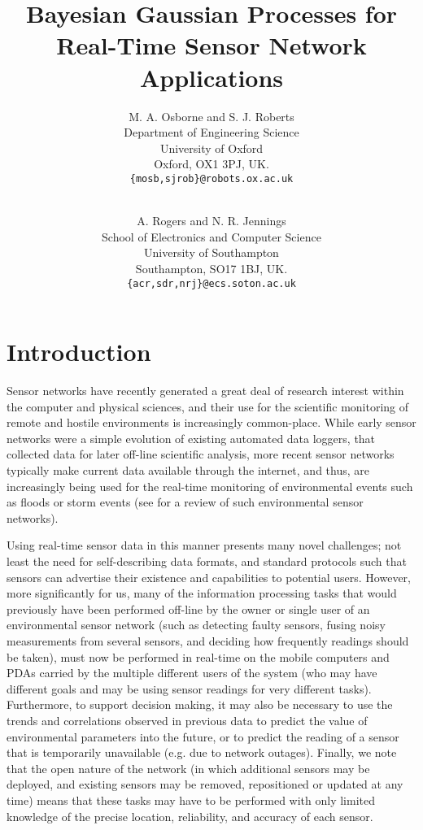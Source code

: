 \documentclass{acmtrans2m}
\title{Bayesian Gaussian Processes for Real-Time Sensor Network Applications}
\author{M. A. Osborne and S. J. Roberts\\
Department of Engineering Science\\
University of Oxford\\
Oxford, OX1 3PJ, UK.\\
{\tt{\{mosb,sjrob\}@robots.ox.ac.uk}}\\
\and\\
A. Rogers and N. R. Jennings\\
School of Electronics and Computer Science\\
University of Southampton\\
Southampton, SO17 1BJ, UK.\\
{\tt{\{acr,sdr,nrj\}@ecs.soton.ac.uk}}\\
}
\begin{document}

\maketitle

\section{Introduction}

\noindent Sensor networks have recently generated a great deal of research interest within the computer and physical sciences, and their use for the scientific monitoring of remote and hostile environments is increasingly common-place. While early sensor networks were a simple evolution of existing automated data loggers, that collected data for later off-line scientific analysis, more recent sensor networks typically make current data available through the internet, and thus, are increasingly being used for the real-time monitoring of environmental events such as floods or storm events (see \cite{esn} for a review of such environmental sensor networks).

Using real-time sensor data in this manner presents many novel challenges; not least the need for self-describing data formats, and standard protocols such that sensors can advertise their existence and capabilities to potential users. However, more significantly for us, many of the information processing tasks that would previously have been performed off-line by the owner or single user of an environmental sensor network (such as detecting faulty sensors, fusing noisy measurements from several sensors, and deciding how frequently readings should be taken), must now be performed in real-time on the mobile computers and PDAs carried by the multiple different users of the system (who may have different goals and may be using sensor readings for very different tasks). Furthermore, to support decision making, it may also be necessary to use the trends and correlations observed in previous data to predict the value of environmental parameters into the future, or to predict the reading of a sensor that is temporarily unavailable (e.g. due to network outages). Finally, we note that the open nature of the network (in which additional sensors may be deployed, and existing sensors may be removed, repositioned or updated at any time) means that these tasks may have to be performed with only limited knowledge of the precise location, reliability, and accuracy of each sensor.
\end{document}
